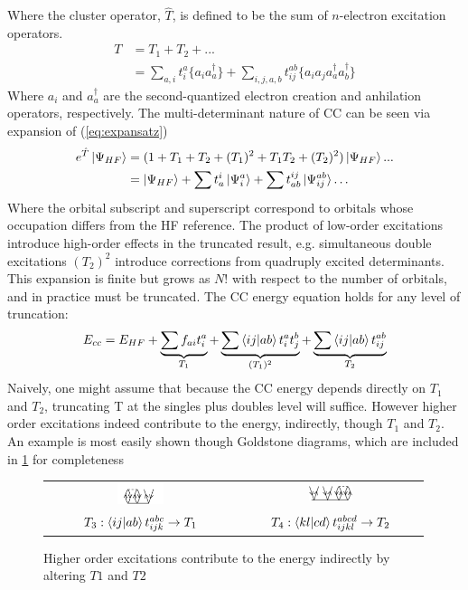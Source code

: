Where the cluster operator, $\hat{T}$, is defined to be the sum of $n$-electron excitation operators.
\begin{align}
T&=T_1 + T_2 + ... \\
&= \sum_{a,i} t^a_i \{a_i a_a^\dag\} + \sum_{i,j,a,b} t_{ij}^{ab} \{a_i a_j a_a^\dag a_b^\dag \}
\end{align}
Where $a_i$ and $a^\dag_a$ are the second-quantized electron creation and anhilation operators, respectively. The multi-determinant nature of CC can be seen via expansion of (\ref{eq:expansatz})
\begin{align}
e^{\hat{T}} \ket{\Psi_{HF}} &= (1 +  T_1 + T_2 + (T_1)^2 + T_1 T_2 + (T_2)^2) \ket{\Psi_{HF}} ...  \\
&= \ket{\Psi_{HF}} + \sum t_a^i \ket{\Psi_i^a} + \sum t_{ab}^{ij}  \ket{\Psi_{ij}^{ab}} \dots 
\end{align}
Where the orbital subscript and superscript correspond to orbitals whose occupation differs from the HF reference. The product of low-order excitations introduce high-order effects in the truncated result, e.g. simultaneous double excitations $(T_2)^2$ introduce corrections from quadruply excited determinants. This expansion is finite but grows as $N!$ with respect to the number of orbitals, and in practice must be truncated. The CC energy equation holds for any level of truncation:
\begin{equation}
E_{cc} = E_{HF} +  \underbrace{\sum f_{ai} t_i^a}_{T_1}  +  \underbrace{\sum \braket{ij|ab} t_i^a t_j^b}_{(T_1)^2} + \underbrace{\sum \braket{ij|ab}  t_{ij}^{ab}}_{T_2}
\end{equation}
Naively, one might assume that because the CC energy depends directly on $T_1$ and $T_2$, truncating T at the singles plus doubles level will suffice. However higher order excitations indeed contribute to the energy, indirectly, though $T_1$ and $T_2$. An example is most easily shown though Goldstone diagrams, which are included in \cref{fig:higherordercontributions} for completeness
\begin{figure}[H]
\begin{center}
\begin{tabular}{cc}
\includegraphics[width=0.25\textwidth]{images/T3toT1.png} & 
\includegraphics[width=0.25\textwidth]{images/T4toT2.png} \\
$T_3: \braket{ij|ab} t_{ijk}^{abc} \rightarrow T_1$ &
$T_4: \braket{kl|cd} t_{ijkl}^{abcd}  \rightarrow T_2$
\end{tabular}
\end{center}
\caption{Higher order excitations contribute to the energy indirectly by altering $T1$ and $T2$}
\label{fig:higherordercontributions}
\end{figure}
